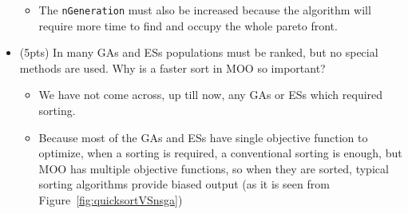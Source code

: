 \documentclass{article}
\begin{document}
\begin{itemize}
\begin{itemize}
            \item The \texttt{nGeneration} must also be increased because the algorithm will require more time to find and occupy the whole pareto front.
        \end{itemize}
        \color{black}
	\item (5pts) In many GAs and ESs populations must be ranked, but no special methods are used. Why is a faster sort in MOO so important?
        \color{blue}
        \begin{itemize}
            \item We have not come across, up till now, any GAs or ESs which required sorting.
            \item Because most of the GAs and ESs have single objective function to optimize, when a sorting is required, a conventional sorting is enough, but MOO has multiple objective functions, so when they are sorted, typical sorting algorithms provide biased output (as it is seen from Figure~\ref{fig:quicksortVSnsga})
        \end{itemize}
        \color{black}
\end{itemize}

\newpage
\end{document}
